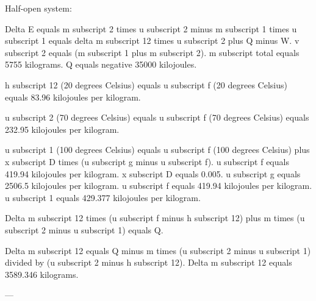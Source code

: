 Half-open system:

Delta E equals m subscript 2 times u subscript 2 minus m subscript 1 times u subscript 1 equals delta m subscript 12 times u subscript 2 plus Q minus W.  
v subscript 2 equals (m subscript 1 plus m subscript 2).  
m subscript total equals 5755 kilograms.  
Q equals negative 35000 kilojoules.

h subscript 12 (20 degrees Celsius) equals u subscript f (20 degrees Celsius) equals 83.96 kilojoules per kilogram.

u subscript 2 (70 degrees Celsius) equals u subscript f (70 degrees Celsius) equals 232.95 kilojoules per kilogram.

u subscript 1 (100 degrees Celsius) equals u subscript f (100 degrees Celsius) plus x subscript D times (u subscript g minus u subscript f).  
u subscript f equals 419.94 kilojoules per kilogram.  
x subscript D equals 0.005.  
u subscript g equals 2506.5 kilojoules per kilogram.  
u subscript f equals 419.94 kilojoules per kilogram.  
u subscript 1 equals 429.377 kilojoules per kilogram.

Delta m subscript 12 times (u subscript f minus h subscript 12) plus m times (u subscript 2 minus u subscript 1) equals Q.

Delta m subscript 12 equals Q minus m times (u subscript 2 minus u subscript 1) divided by (u subscript 2 minus h subscript 12).  
Delta m subscript 12 equals 3589.346 kilograms.

---